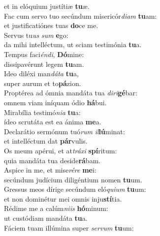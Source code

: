 \oddverse et in elóquium justítiæ \textbf{tu}æ.\\
\evenverse Fac cum servo tuo secúndum misericór\textit{di}\textit{am} \textbf{tu}am:~\*\\
\evenverse et justificatiónes tuas \textbf{do}ce me.\\
\oddverse Servus tu\textit{us} \textit{sum} \textbf{e}go:~\*\\
\oddverse da mihi intelléctum, ut sciam testimónia \textbf{tu}a.\\
\evenverse Tempus faci\textit{én}\textit{di}, \textbf{Dó}mine:~\*\\
\evenverse dissipavérunt legem \textbf{tu}am.\\
\oddverse Ideo diléxi man\textit{dá}\textit{ta} \textbf{tu}a,~\*\\
\oddverse super aurum et to\textbf{pá}zion.\\
\evenverse Proptérea ad ómnia mandáta tua \textit{di}\textit{ri}\textbf{gé}bar:~\*\\
\evenverse omnem viam iníquam ódio \textbf{há}bui.\\
\oddverse Mirabília testimó\textit{ni}\textit{a} \textbf{tu}a:~\*\\
\oddverse ídeo scrutáta est ea ánima \textbf{me}a.\\
\evenverse Declarátio sermónum tuó\textit{rum} \textit{il}\textbf{lú}minat:~\*\\
\evenverse et intelléctum dat \textbf{pár}vulis.\\
\oddverse Os meum apérui, et at\textit{trá}\textit{xi} \textbf{spí}ritum:~\*\\
\oddverse quia mandáta tua deside\textbf{rá}bam.\\
\evenverse Aspice in me, et mise\textit{ré}\textit{re} \textbf{me}i:~\*\\
\evenverse secúndum judícium diligéntium nomen \textbf{tu}um.\\
\oddverse Gressus meos dírige secúndum eló\textit{qui}\textit{um} \textbf{tu}um:~\*\\
\oddverse et non dominétur mei omnis inju\textbf{stí}tia.\\
\evenverse Rédime me a calúm\textit{ni}\textit{is} \textbf{hó}minum:~\*\\
\evenverse ut custódiam mandáta \textbf{tu}a.\\
\oddverse Fáciem tuam illúmina super \textit{ser}\textit{vum} \textbf{tu}um:~\*\\
